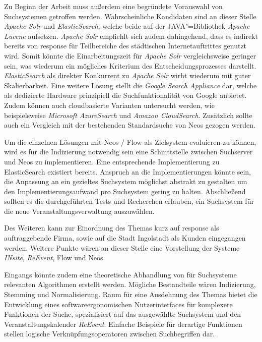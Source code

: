Zu Beginn der Arbeit muss außerdem eine begründete Vorauswahl von Suchsystemen getroffen werden. Wahrscheinliche Kandidaten sind an dieser Stelle \emph{Apache Solr} und \emph{ElasticSearch}, welche beide auf der JAVA"=Bibliothek \emph{Apache Lucene} aufsetzen. \emph{Apache Solr} empfiehlt sich zudem dahingehend, dass es indirekt bereits von response für Teilbereiche des städtischen Internetauftrittes genutzt wird. Somit könnte die Einarbeitungszeit für \emph{Apache Solr} vergleichsweise geringer sein, was wiederum ein mögliches Kriterium des Entscheidungsprozesses darstellt. \emph{ElasticSearch} als direkter Konkurrent zu \emph{Apache Solr} wirbt wiederum mit guter Skalierbarkeit. Eine weitere Lösung stellt die \emph{Google Search Appliance} dar, welche als dedizierte Hardware prinzipiell die Suchfunktionalität von Google anbietet. Zudem können auch cloudbasierte Varianten untersucht werden, wie beispielsweise \emph{Microsoft AzureSearch} und \emph{Amazon CloudSearch}. Zusätzlich sollte auch ein Vergleich mit der bestehenden Standardsuche von Neos gezogen werden.

Um die einzelnen Lösungen mit Neos / Flow als Zielsystem evaluieren zu können, wird es für die Indizierung notwendig sein eine Schnittstelle zwischen Suchserver und Neos zu implementieren. Eine entsprechende Implementierung zu ElasticSearch existiert bereits. Anspruch an die Implementierungen könnte sein, die Anpassung an ein gezieltes Suchsystem möglichst abstrakt zu gestalten um den Implementierungsaufwand pro Suchsystem gering zu halten. Abschließend sollten es die durchgeführten Tests und Recherchen erlauben, ein Suchsystem für die neue Veranstaltungsverwaltung auszuwählen.

Des Weiteren kann zur Einordnung des Themas kurz auf response als auftraggebende Firma, sowie auf die Stadt Ingolstadt als Kunden eingegangen werden. Weitere Punkte wären an dieser Stelle eine Vorstellung der Systeme \emph{INsite}, \emph{ReEvent}, Flow und Neos.

Eingangs könnte zudem eine theoretische Abhandlung von für Suchsysteme relevanten Algorithmen erstellt werden. Mögliche Bestandteile wären Indizierung, Stemming und Normalisierung. Raum für eine Ausdehnung des Themas bietet die Entwicklung eines softwareergonomischen Nutzerinterfaces für komplexere Funktionen der Suche, spezialisiert auf das ausgewählte Suchsystem und den Veranstaltungskalender \emph{ReEvent}. Einfache Beispiele für derartige Funktionen stellen logische Verknüpfungsoperatoren zwischen Suchbegriffen dar.